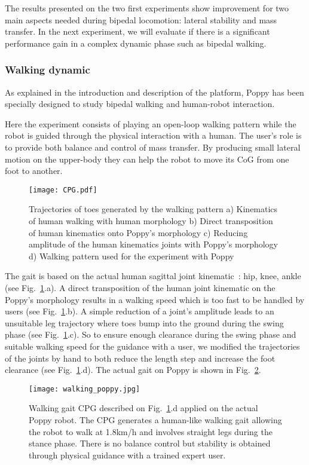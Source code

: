 The results presented on the two first experiments show improvement for two main aspects needed during bipedal locomotion: lateral stability and mass transfer. In the next experiment, we will evaluate if there is a significant performance gain in a complex dynamic phase such as bipedal walking.


\subsubsection{Walking dynamic} %
\label{sub:walking_dynamic}

As explained in the introduction and description of the platform, Poppy has been specially designed to study bipedal walking and human-robot interaction.

Here the experiment consists of playing an open-loop walking pattern while the robot is guided through the physical interaction with a human. The user’s role is to provide both balance and control of mass transfer. By producing small lateral motion on the upper-body they can help the robot to move its CoG from one foot to another.

\begin{figure}[h]
    \centering
    \texttt{[image: CPG.pdf]}
    \caption{Trajectories of toes generated by the walking pattern a) Kinematics of human walking
    with human morphology b) Direct transposition of human kinematics onto Poppy's morphology
    c) Reducing amplitude of the human kinematics joints with Poppy's morphology d) Walking pattern
    used for the experiment with Poppy}
    \label{fig:CPG}
\end{figure}

The gait is based on the actual human sagittal joint kinematic~\cite{Nester2003}: hip, knee, ankle (see Fig.~\ref{fig:CPG}.a). A direct transposition of the human joint kinematic on the Poppy's morphology results in a walking speed which is too fast to be handled by users (see Fig.~\ref{fig:CPG}.b). A simple reduction of a joint’s amplitude leads to an unsuitable leg trajectory where toes bump into the ground during the swing phase (see Fig.~\ref{fig:CPG}.c). So to ensure enough clearance during the swing phase and suitable walking speed for the guidance with a user, we modified the trajectories of the joints by hand to both reduce the length step and increase the foot clearance (see Fig.~\ref{fig:CPG}.d). The actual gait on Poppy is shown in Fig.~\ref{fig:humanoids2013_cpg_on_poppy}.

\begin{figure}[h]
    \centering
    \texttt{[image: walking\_poppy.jpg]}
    \caption{Walking gait CPG described on Fig.~\ref{fig:CPG}.d applied on the actual Poppy robot.
    The CPG generates a human-like walking gait allowing the robot to walk at 1.8km/h and involves straight legs during the stance phase.
    There is no balance control but stability is obtained through physical guidance with a trained expert user.}
    \label{fig:humanoids2013_cpg_on_poppy}
\end{figure}

